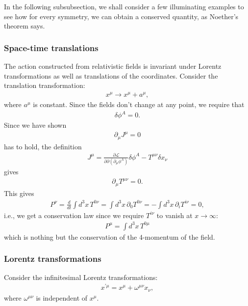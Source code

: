 \documentclass[a4paper,11pt]{article}
\numberwithin{equation}{section}
\theoremstyle{definition}
\newcommand{\p}{\partial}
\newcommand{\lag}{\mathcal{L}}
\begin{document}
In the following subsubsection, we shall consider a few illuminating examples to see how for every symmetry, we can obtain a conserved quantity, as Noether's theorem says.\\

\subsubsection{Space-time translations}


The action constructed from relativistic fields is invariant under Lorentz transformations as well as translations of the coordinates. Consider the translation transformation:
\begin{align}
x^\mu \to x^\mu + a^\mu,
\end{align}
where $a^\mu$ is constant. Since the fields don't change at any point, we require that
\begin{align}
\delta \phi^A = 0.
\end{align}
Since we have shown 
\begin{align}
\p_\mu J^\mu = 0
\end{align}
has to hold, the definition
\begin{align}
J^\mu = \frac{\p \lag}{\p \p(\p_\mu \phi^A)}\delta \phi^A - T^{\mu\nu}\delta x_\nu
\end{align}
gives
\begin{align}
\p_\mu T^{\mu\nu} = 0.
\end{align}
This gives
\begin{align}
P^\nu = \frac{d}{dt}\int d^3x\, T^{0\nu} = \int d^3x\, \p_0 T^{0\nu} = - \int d^3x\, \p_i T^{i\nu} = 0,
\end{align}
i.e., we get a conservation law since we require $T^{i\nu}$ to vanish at $x \to \infty$:
\begin{align}
\boxed{P^\mu = \int d^3x\, T^{0\mu}}
\end{align}
which is nothing but the conservation of the 4-momentum of the field.




\subsubsection{Lorentz transformations}


Consider the infinitesimal Lorentz transformations:
\begin{align}
x^{'\mu} = x^\mu + \omega^{\mu\nu}x_\nu,
\end{align}
where $\omega^{\mu\nu}$ is independent of $x^\mu$.
\end{document}
